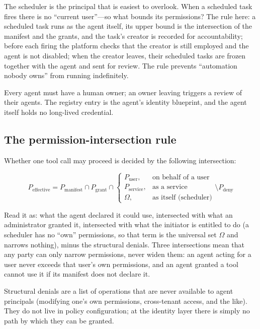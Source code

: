 The scheduler is the principal that is easiest to overlook. When a scheduled task fires there is no ``current user''---so what bounds its permissions? The rule here: a scheduled task runs as the agent itself, its upper bound is the intersection of the manifest and the grants, and the task's creator is recorded for accountability; before each firing the platform checks that the creator is still employed and the agent is not disabled; when the creator leaves, their scheduled tasks are frozen together with the agent and sent for review. The rule prevents ``automation nobody owns'' from running indefinitely.

Every agent must have a human owner; an owner leaving triggers a review of their agents. The registry entry is the agent's identity blueprint, and the agent itself holds no long-lived credential.

\subsection{The permission-intersection rule}

Whether one tool call may proceed is decided by the following intersection:

\[
  P_{\text{effective}}
  =
  P_{\text{manifest}}
  \cap P_{\text{grant}}
  \cap
  \begin{cases}
    P_{\text{user}}, & \text{on behalf of a user}\\
    P_{\text{service}}, & \text{as a service}\\
    \Omega, & \text{as itself (scheduler)}
  \end{cases}
  \setminus P_{\text{deny}}
\]

Read it as: what the agent declared it could use, intersected with what an administrator granted it, intersected with what the initiator is entitled to do (a scheduler has no ``own'' permissions, so that term is the universal set $\Omega$ and narrows nothing), minus the structural denials. Three intersections mean that any party can only narrow permissions, never widen them: an agent acting for a user never exceeds that user's own permissions, and an agent granted a tool cannot use it if its manifest does not declare it.

Structural denials are a list of operations that are never available to agent principals (modifying one's own permissions, cross-tenant access, and the like). They do not live in policy configuration; at the identity layer there is simply no path by which they can be granted.

